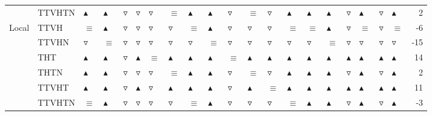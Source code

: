 \begin{table}
\begin{tabular}{llllllllllllllllllllr}
       & TTVHTN &  $\blacktriangle$ &  $\blacktriangle$ &  $\triangledown$ &   $\triangledown$ &   $\triangledown$ &          $\equiv$ &  $\blacktriangle$ &  $\blacktriangle$ &   $\triangledown$ &          $\equiv$ &   $\triangledown$ &  $\blacktriangle$ &  $\blacktriangle$ &  $\blacktriangle$ &   $\triangledown$ &  $\blacktriangle$ &   $\triangledown$ &  $\blacktriangle$ &        2 \\
Local & TTVH &          $\equiv$ &  $\blacktriangle$ &  $\triangledown$ &   $\triangledown$ &   $\triangledown$ &   $\triangledown$ &          $\equiv$ &  $\blacktriangle$ &   $\triangledown$ &   $\triangledown$ &   $\triangledown$ &          $\equiv$ &          $\equiv$ &  $\blacktriangle$ &   $\triangledown$ &          $\equiv$ &   $\triangledown$ &          $\equiv$ &       -6 \\
       & TTVHN &   $\triangledown$ &          $\equiv$ &  $\triangledown$ &   $\triangledown$ &   $\triangledown$ &   $\triangledown$ &   $\triangledown$ &          $\equiv$ &   $\triangledown$ &   $\triangledown$ &   $\triangledown$ &   $\triangledown$ &   $\triangledown$ &          $\equiv$ &   $\triangledown$ &   $\triangledown$ &   $\triangledown$ &   $\triangledown$ &      -15 \\
       & THT &  $\blacktriangle$ &  $\blacktriangle$ &  $\triangledown$ &  $\blacktriangle$ &          $\equiv$ &  $\blacktriangle$ &  $\blacktriangle$ &  $\blacktriangle$ &          $\equiv$ &  $\blacktriangle$ &  $\blacktriangle$ &  $\blacktriangle$ &  $\blacktriangle$ &  $\blacktriangle$ &  $\blacktriangle$ &  $\blacktriangle$ &  $\blacktriangle$ &  $\blacktriangle$ &       14 \\
       & THTN &  $\blacktriangle$ &  $\blacktriangle$ &  $\triangledown$ &   $\triangledown$ &   $\triangledown$ &          $\equiv$ &  $\blacktriangle$ &  $\blacktriangle$ &   $\triangledown$ &          $\equiv$ &   $\triangledown$ &  $\blacktriangle$ &  $\blacktriangle$ &  $\blacktriangle$ &   $\triangledown$ &  $\blacktriangle$ &   $\triangledown$ &  $\blacktriangle$ &        2 \\
       & TTVHT &  $\blacktriangle$ &  $\blacktriangle$ &  $\triangledown$ &  $\blacktriangle$ &   $\triangledown$ &  $\blacktriangle$ &  $\blacktriangle$ &  $\blacktriangle$ &   $\triangledown$ &  $\blacktriangle$ &          $\equiv$ &  $\blacktriangle$ &  $\blacktriangle$ &  $\blacktriangle$ &  $\blacktriangle$ &  $\blacktriangle$ &  $\blacktriangle$ &  $\blacktriangle$ &       11 \\
       & TTVHTN &          $\equiv$ &  $\blacktriangle$ &  $\triangledown$ &   $\triangledown$ &   $\triangledown$ &   $\triangledown$ &          $\equiv$ &  $\blacktriangle$ &   $\triangledown$ &   $\triangledown$ &   $\triangledown$ &          $\equiv$ &  $\blacktriangle$ &  $\blacktriangle$ &   $\triangledown$ &  $\blacktriangle$ &   $\triangledown$ &  $\blacktriangle$ &       -3 \\

\end{tabular}
\end{table}
